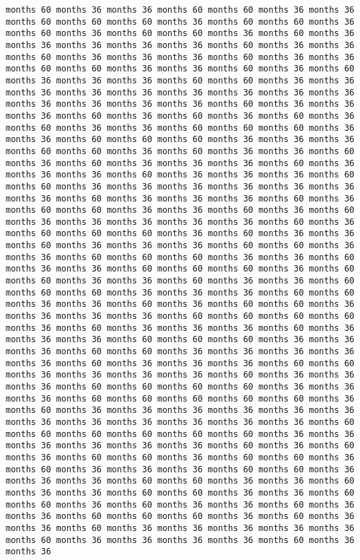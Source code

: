 \documentclass[11pt]{article}
\begin{document}
\begin{Verbatim}[commandchars=\\\{\}, frame=single, framerule=2mm, rulecolor=\color{outerrorbackground}]
months 60 months 36 months 36 months 60 months 60 months 36 months 36 months 60 months 60 months 60 months 36 months 60 months 60 months 36 months 60 months 36 months 60 months 60 months 36 months 60 months 36 months 36 months 36 months 36 months 36 months 60 months 36 months 36 months 60 months 36 months 36 months 36 months 60 months 36 months 36 months 60 months 60 months 36 months 36 months 60 months 36 months 60 months 36 months 36 months 36 months 60 months 60 months 36 months 36 months 36 months 36 months 36 months 36 months 36 months 36 months 36 months 36 months 36 months 36 months 36 months 60 months 36 months 36 months 36 months 60 months 36 months 60 months 36 months 60 months 36 months 60 months 36 months 36 months 60 months 60 months 60 months 36 months 36 months 60 months 60 months 60 months 36 months 36 months 36 months 60 months 60 months 36 months 60 months 36 months 36 months 60 months 36 months 60 months 36 months 36 months 36 months 60 months 36 months 36 months 36 months 60 months 36 months 36 months 36 months 60 months 60 months 36 months 36 months 36 months 36 months 36 months 36 months 36 months 60 months 36 months 36 months 36 months 60 months 36 months 60 months 60 months 36 months 36 months 60 months 36 months 60 months 36 months 36 months 36 months 36 months 36 months 60 months 36 months 60 months 60 months 60 months 36 months 60 months 36 months 36 months 60 months 36 months 36 months 36 months 60 months 60 months 36 months 36 months 60 months 60 months 60 months 36 months 36 months 60 months 36 months 36 months 60 months 60 months 60 months 36 months 60 months 60 months 36 months 36 months 60 months 36 months 36 months 60 months 60 months 60 months 36 months 36 months 36 months 60 months 60 months 36 months 36 months 60 months 36 months 60 months 60 months 36 months 36 months 36 months 36 months 60 months 60 months 60 months 60 months 36 months 60 months 36 months 36 months 36 months 60 months 36 months 36 months 36 months 60 months 60 months 60 months 36 months 36 months 36 months 60 months 60 months 36 months 36 months 36 months 36 months 36 months 60 months 36 months 36 months 36 months 60 months 60 months 36 months 36 months 36 months 36 months 60 months 36 months 36 months 36 months 60 months 60 months 60 months 60 months 36 months 36 months 36 months 60 months 60 months 60 months 60 months 60 months 36 months 60 months 36 months 36 months 36 months 36 months 36 months 36 months 36 months 36 months 36 months 36 months 36 months 36 months 60 months 60 months 60 months 60 months 60 months 60 months 36 months 36 months 36 months 36 months 36 months 36 months 60 months 36 months 60 months 36 months 60 months 60 months 36 months 60 months 60 months 36 months 60 months 36 months 36 months 36 months 60 months 60 months 36 months 36 months 36 months 60 months 60 months 36 months 36 months 60 months 36 months 36 months 60 months 60 months 36 months 36 months 60 months 60 months 36 months 60 months 36 months 36 months 60 months 36 months 36 months 60 months 60 months 60 months 36 months 60 months 36 months 36 months 60 months 36 months 36 months 36 months 36 months 36 months 60 months 36 months 36 months 36 months 36 months 60 months 36 months 36 
\end{Verbatim}
\end{document}
